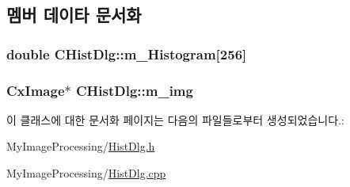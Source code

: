 \subsection{멤버 데이타 문서화}
\hypertarget{class_c_hist_dlg_a6c2d395cebef6f871fd1791fa57b6f55}{
\subsubsection[{m\-\_\-\-Histogram}]{\setlength{\rightskip}{0pt plus 5cm}double C\-Hist\-Dlg\-::m\-\_\-\-Histogram\mbox{[}256\mbox{]}\hspace{0.3cm}{\ttfamily [private]}}}\label{class_c_hist_dlg_a6c2d395cebef6f871fd1791fa57b6f55}
\hypertarget{class_c_hist_dlg_a931451fed18d5abe289575cecc8e9f54}{
\subsubsection[{m\-\_\-img}]{\setlength{\rightskip}{0pt plus 5cm}Cx\-Image$\ast$ C\-Hist\-Dlg\-::m\-\_\-img\hspace{0.3cm}{\ttfamily [private]}}}\label{class_c_hist_dlg_a931451fed18d5abe289575cecc8e9f54}


이 클래스에 대한 문서화 페이지는 다음의 파일들로부터 생성되었습니다.\-:\begin{DoxyCompactItemize}
\item 
My\-Image\-Processing/\hyperlink{_hist_dlg_8h}{Hist\-Dlg.\-h}\item 
My\-Image\-Processing/\hyperlink{_hist_dlg_8cpp}{Hist\-Dlg.\-cpp}\end{DoxyCompactItemize}
